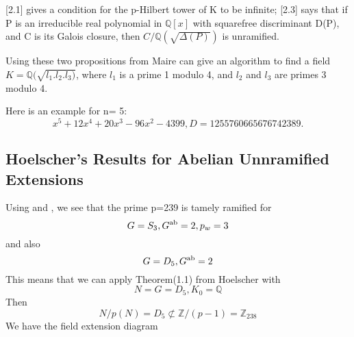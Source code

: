 \documentclass[12pt]{extarticle}
\newcommand{\<}{\langle}
\renewcommand{\>}{\rangle}
\theoremstyle{definition}
\begin{document}
\cite{MAIR}[2.1] gives a condition for the p-Hilbert tower of K to be infinite; \cite{MAIR}[2.3] says that if P is an irreducible real polynomial in $\mathbb{Q}[x]$ with squarefree discriminant D(P), and C is its Galois closure, then $C/\mathbb{Q}(\sqrt{\Delta(P)})$ is unramified.
\par
Using these two propositions from Maire can give an algorithm to find a field $K=\mathbb{Q}(\sqrt{l_1.l_2.l_3)}$, where $l_1$ is a prime 1 modulo 4, and $l_2$ and $l_3$ are primes 3 modulo 4. 
\par
Here is an example for n= 5:
\begin{equation}
    x^5 + 12x^4 + 20x^3 - 96x^2 - 4399, D=1255760665676742389.
\end{equation}


\subsection{Hoelscher's Results for Abelian Unnramified Extensions}
Using \cite{HOEL} and \cite{JONE}, we see that 
the prime p=239 is tamely ramified for 
\begin{equation}
  G=S_3,G\textsuperscript{ab} = 2, p_w =3  
\end{equation} and also 
\begin{equation}
    G=D_5,G\textsuperscript{ab} = 2 
\end{equation}
This means that we can apply Theorem(1.1) from Hoelscher with
\begin{equation}
    N = G = D_5, K_0 = \mathbb{Q}
\end{equation}
Then 
\begin{equation}
N/p(N) = D_5 \not\subset \mathbb{Z}/(p-1) = \mathbb{Z}_{238}
\end{equation}
We have the field extension diagram
\begin{center}
    
\end{center}
\end{document}

